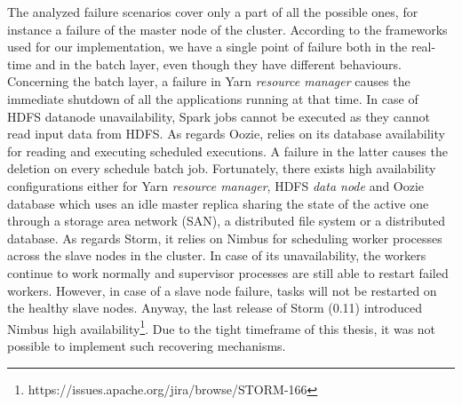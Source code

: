 The analyzed failure scenarios cover only a part of all the possible ones, for instance a failure of the master node of the cluster. According to the frameworks used for our implementation, we have a single point of failure both in the real-time and in the batch layer, even though they have different behaviours. Concerning the batch layer, a failure in Yarn \textit{resource manager} causes the immediate shutdown of all the applications running at that time. In case of HDFS datanode unavailability, Spark jobs cannot be executed as they cannot read input data from HDFS. As regards Oozie, relies on its database availability for reading and executing scheduled executions. A failure in the latter causes the deletion on every schedule batch job. Fortunately, there exists high availability configurations either for Yarn \textit{resource manager}, HDFS \textit{data node} and Oozie database which uses an idle master replica sharing the state of the active one through a storage area network (SAN), a distributed file system or a distributed database. As regards Storm, it relies on Nimbus for scheduling worker processes across the slave nodes in the cluster. In case of its unavailability, the workers continue to work normally and supervisor processes are still able to restart failed workers. However, in case of a slave node failure, tasks will not be restarted on the healthy slave nodes. Anyway, the last release of Storm (0.11) introduced Nimbus high availability\footnote{https://issues.apache.org/jira/browse/STORM-166}. Due to the tight timeframe of this thesis, it was not possible to implement such recovering mechanisms.